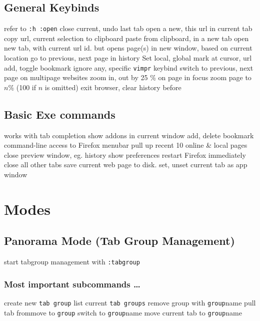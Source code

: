 \subsection{General Keybinds}	{refer to {\tt :h :open}}
	{close current, undo last tab}
	{open a new, this url in current tab}
	{copy url, current selection to clipboard}
	{paste from clipboard, in a new tab}
	{open new tab, with current url}
	{id. but opens page(s) in new window, based on current location}
	{go to previous, next page in history}
	{Set local, global mark at cursor, url}
	{add, toggle bookmark}
	{ignore any, specific {\tt vimpr} keybind}
\cmdS{\lbracket\lbracket~\rbracket\rbracket}	{switch to previous, next page on multipage websites}
\cmdS{+~-}	{zoom in, out by 25 \% on page in focus}
	{zoom page to $n$\% (100 if $n$ is omitted)}
	{exit browser, clear history before}

\subsection{Basic Exe commands}{works with tab completion}
	{show addons in current window}
	{add, delete bookmark}
	{command-line access to Firefox menubar}
	{pull up recent 10 online \& local pages}
	{close preview window, eg. history}
	{show preferences}
	{restart Firefox immediately}
	{close all other tabs}
	{save current web page to disk.}
	{set, unset current tab as app window}

\section{Modes}{}
\subsection{Panorama Mode (Tab Group Management)}{start tabgroup management with {\tt :tabgroup }}
\subsubsection{Most important subcommands \ldots}{}
	{create new {\tt tab group}}
	{list current {\tt tab groups}}
	{remove group with {\tt group}name}
	{pull tab from\or move to {\tt group}}
	{switch to {\tt group}name}
	{move current tab to {\tt group}name}


